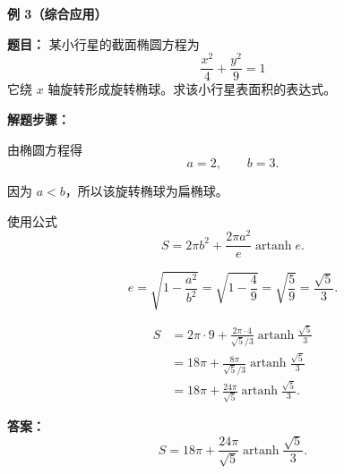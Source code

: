 \begin{examplebox}
	\medskip

	\textbf{\textcolor{CExample}{例 3（综合应用）}}

	\textbf{\textcolor{CExample}{题目：}}
	某小行星的截面椭圆方程为
	\[
		\frac{x^{2}}{4}+\frac{y^{2}}{9}=1
	\]
	它绕 $x$ 轴旋转形成旋转椭球。求该小行星表面积的表达式。

	\medskip

	\textbf{\textcolor{CExample}{解题步骤：}}

	\begin{description}[style=nextline, leftmargin=2.8em, labelsep=0.5em, itemsep=0.45em]

		\item[\textbf{第一步（读取参数）：}]
		      由椭圆方程得
		      \[
			      a=2,\qquad b=3.
		      \]

		\item[\textbf{第二步（判断类型）：}]
		      因为 $a<b$，所以该旋转椭球为扁椭球。

		      使用公式
		      \[
			      S
			      =
			      2\pi b^{2}
			      +
			      \frac{2\pi a^{2}}{e}\operatorname{artanh}e.
		      \]

		\item[\textbf{第三步（计算离心率）：}]
		      \[
			      e
			      =
			      \sqrt{1-\frac{a^{2}}{b^{2}}}
			      =
			      \sqrt{1-\frac49}
			      =
			      \sqrt{\frac59}
			      =
			      \frac{\sqrt5}{3}.
		      \]

		\item[\textbf{第四步（代入公式）：}]
		      \[
			      \begin{aligned}
				      S
				       & =
				      2\pi\cdot 9
				      +
				      \frac{2\pi\cdot 4}{\sqrt5/3}
				      \operatorname{artanh}\frac{\sqrt5}{3}
				      \\
				       & =
				      18\pi
				      +
				      \frac{8\pi}{\sqrt5/3}
				      \operatorname{artanh}\frac{\sqrt5}{3}
				      \\
				       & =
				      18\pi
				      +
				      \frac{24\pi}{\sqrt5}
				      \operatorname{artanh}\frac{\sqrt5}{3}.
			      \end{aligned}
		      \]

	\end{description}

	\textbf{\textcolor{CExample}{答案：}}
	\[
		\boxed{
			S
			=
			18\pi
			+
			\frac{24\pi}{\sqrt5}
			\operatorname{artanh}\frac{\sqrt5}{3}
		}.
	\]

\end{examplebox}